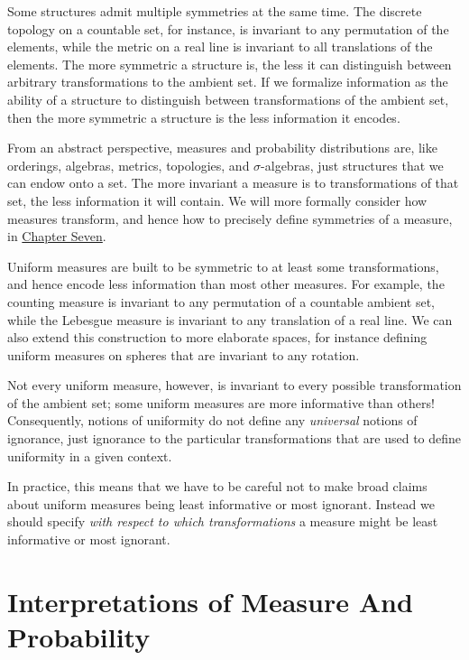 \documentclass[
  letterpaper,
  DIV=11,
  numbers=noendperiod]{scrartcl}
\begin{document}
Some structures admit multiple symmetries at the same time. The discrete
topology on a countable set, for instance, is invariant to any
permutation of the elements, while the metric on a real line is
invariant to all translations of the elements. The more symmetric a
structure is, the less it can distinguish between arbitrary
transformations to the ambient set. If we formalize information as the
ability of a structure to distinguish between transformations of the
ambient set, then the more symmetric a structure is the less information
it encodes.

From an abstract perspective, measures and probability distributions
are, like orderings, algebras, metrics, topologies, and
\(\sigma\)-algebras, just structures that we can endow onto a set. The
more invariant a measure is to transformations of that set, the less
information it will contain. We will more formally consider how measures
transform, and hence how to precisely define symmetries of a measure, in
\href{http://www.symplectomorphic.com/assets/chapters_html/transforming_probability_spaces.html}{Chapter
Seven}.

Uniform measures are built to be symmetric to at least some
transformations, and hence encode less information than most other
measures. For example, the counting measure is invariant to any
permutation of a countable ambient set, while the Lebesgue measure is
invariant to any translation of a real line. We can also extend this
construction to more elaborate spaces, for instance defining uniform
measures on spheres that are invariant to any rotation.

Not every uniform measure, however, is invariant to every possible
transformation of the ambient set; some uniform measures are more
informative than others! Consequently, notions of uniformity do not
define any \emph{universal} notions of ignorance, just ignorance to the
particular transformations that are used to define uniformity in a given
context.

In practice, this means that we have to be careful not to make broad
claims about uniform measures being least informative or most ignorant.
Instead we should specify \emph{with respect to which transformations} a
measure might be least informative or most ignorant.

\section{Interpretations of Measure And
Probability}\label{sec:interpretations}
\end{document}
